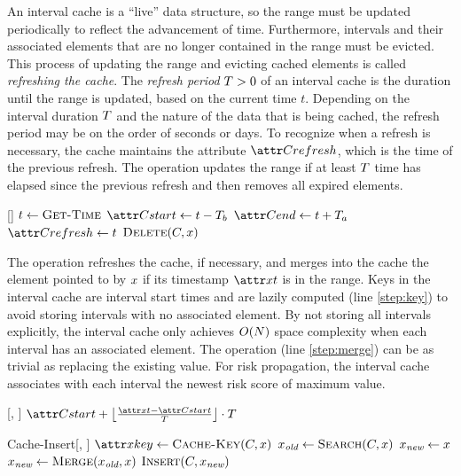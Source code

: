 An interval cache is a ``live'' data structure, so the range must be updated periodically to reflect the advancement of time. Furthermore, intervals and their associated elements that are no longer contained in the range must be evicted. This process of updating the range and evicting cached elements is called \emph{refreshing the cache}. The \emph{refresh period} $T > 0$ of an interval cache is the duration until the range is updated, based on the current time $t$. Depending on the interval duration $T$ and the nature of the data that is being cached, the refresh period may be on the order of seconds or days. To recognize when a refresh is necessary, the cache maintains the attribute $\aCacheRefresh$, which is the time of the previous refresh. The operation \cCacheRefresh updates the range if at least $T$ time has elapsed since the previous refresh and then removes all expired elements.
%
\begin{function}{\nCacheRefresh}[\vCache]
    \State $t \assign \cGetTime$
    	\State $\aCacheStart \assign t - \pCacheLookBack$
    	\State $\aCacheEnd \assign t + \pCacheLookAhead$
    	\State $\aCacheRefresh \assign t$
    	\ForEach{$\vCacheItem \in \vCache$}
    		\If{$\aCacheItemKey < \aCacheStart$}
    			\State $\cDelete[\vCache, \vCacheItem]$
    		\EndIf
    	\EndFor
    \EndIf
\end{function}

The operation \cCacheInsert refreshes the cache, if necessary, and merges into the cache the element pointed to by $x$ if its timestamp $\aCacheItemTime$ is in the range. Keys in the interval cache are interval start times and are lazily computed (line \ref{step:key}) to avoid storing intervals with no associated element. By not storing all intervals explicitly, the interval cache only achieves $O(N)$ space complexity when each interval has an associated element. The \cMerge operation (line \ref{step:merge}) can be as trivial as replacing the existing value. For risk propagation, the interval cache associates with each interval the newest risk score of maximum value.
%
\begin{function}{\nCacheKey}[\vCache, \vCacheItem]
    \State \Return $\aCacheStart + \floor{\frac{\aCacheItemTime - \aCacheStart}{\pDuration}} \cdot \pDuration$
\end{function}
%
\begin{function}{Cache-Insert}[\vCache, \vCacheItem]
    \If{$\aCacheItemTime \in [\aCacheStart, \aCacheEnd)$}
    	\State $\aCacheItemKey \assign \cCacheKey[\vCache, \vCacheItem]$ \label{step:key}
    	\State $\vOldCacheItem \assign \cSearch[\vCache, \vCacheItem]$
    	\If{$\vOldCacheItem \equals \nil$}
    		\State $x_{\textit{new}} \leftarrow x$
    	\Else
    		\State $\vNewCacheItem \assign \cMerge[\vOldCacheItem, \vCacheItem]$ \label{step:merge}
    	\EndIf
    	\State $\cInsert[\vCache, \vNewCacheItem]$
    \EndIf
\end{function}

